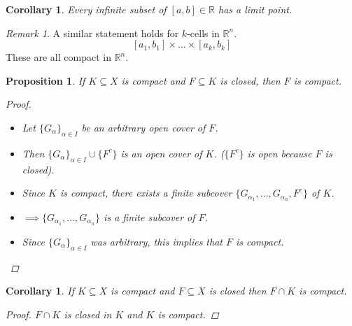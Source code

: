 \documentclass[10pt]{article}
\newcommand{\R}{\mathbb{R}}
\newtheorem{corollary}[theorem]{Corollary}
\newtheorem{proposition}[theorem]{Proposition}
\theoremstyle{definition}
\theoremstyle{remark}
\newtheorem*{remark}{Remark}
\begin{document}
\begin{corollary}
    Every infinite subset of $[a, b] \in \R$ has a limit point.
\end{corollary}

\begin{remark}
    A similar statement holds for $k$-cells in $\R^n$.
    $$[a_1, b_1] \times \ldots \times [a_k, b_k]$$
    These are all compact in $\R^n$.
\end{remark}

\newpage

\begin{proposition}
    If $K \subseteq X$ is compact and $F \subseteq K$ is closed, then $F$ is compact.

    \begin{proof}
        \hfill
        \begin{itemize}
            \item
                Let $\{G_\alpha\}_{\alpha \in I}$ be an arbitrary open cover of $F$.
            \item 
                Then $\{G_\alpha\}_{\alpha \in I} \cup \{F^c\}$ is an open cover of $K$.
                ($\{F^c\}$ is open because $F$ is closed).
            \item 
                Since $K$ is compact, there exists a finite subcover $\{G_{\alpha_1}, \ldots, G_{\alpha_n}, F^c\}$ of $K$.
            \item $\implies \{G_{\alpha_1}, \ldots, G_{\alpha_n}\}$ is a finite subcover of $F$.
            \item Since $\{G_\alpha\}_{\alpha \in I}$ was arbitrary, this implies that $F$ is compact.
        \end{itemize}
    \end{proof}
\end{proposition}

\begin{corollary}
    If $K \subseteq X$ is compact and $F \subseteq X$ is closed then $F \cap K$ is compact.
    \begin{proof}
        $F \cap K$ is closed in $K$ and $K$ is compact.
    \end{proof}
\end{corollary}
\end{document}
